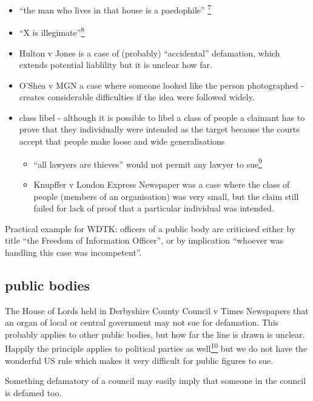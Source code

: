 \documentclass[]{article}
\begin{document}
\begin{itemize}
\item
  ``{the man who lives in that house is a paedophile''
  \hyperref[sdfootnote7sym]{\textsuperscript{7}}}
\item
  ``{X is illegimate''\hyperref[sdfootnote8sym]{\textsuperscript{8}}}
\item
  Hulton v Jones is a case of (probably) ``accidental'' defamation,
  which extends potential liablility but it is unclear how far.
\item
  O'Shea v MGN a case where someone looked like the person photographed
  - creates considerable difficulties if the idea were followed widely.
\item
  class libel - although it is possible to libel a class of people a
  claimant has to prove that they individually were intended as the
  target because the courts accept that people make loose and wide
  generalisations

  \begin{itemize}
  \item
    ``{all lawyers are thieves'' would not permit any lawyer to
    sue\hyperref[sdfootnote9sym]{\textsuperscript{9}}}
  \item
    Knupffer v London Express Newspaper was a case where the class of
    people (members of an organisation) was very small, but the claim
    still failed for lack of proof that a particular individual was
    intended.
  \end{itemize}
\end{itemize}

Practical example for WDTK: officers of a public body are criticised
either by title ``the Freedom of Information Officer'', or by
implication ``whoever was handling this case was incompetent''.

\subsection{public bodies}

{The House of Lords held in Derbyshire County Council v Times Newspapers
that an organ of local or central government may not sue for defamation.
This probably applies to other public bodies, but how far the line is
drawn is unclear. Happily the principle applies to political parties as
well\hyperref[sdfootnote10sym]{\textsuperscript{10}} but we do not have
the wonderful US rule which makes it very difficult for public figures
to sue.}

Something defamatory of a council may easily imply that someone in the
council is defamed too.
\end{document}

